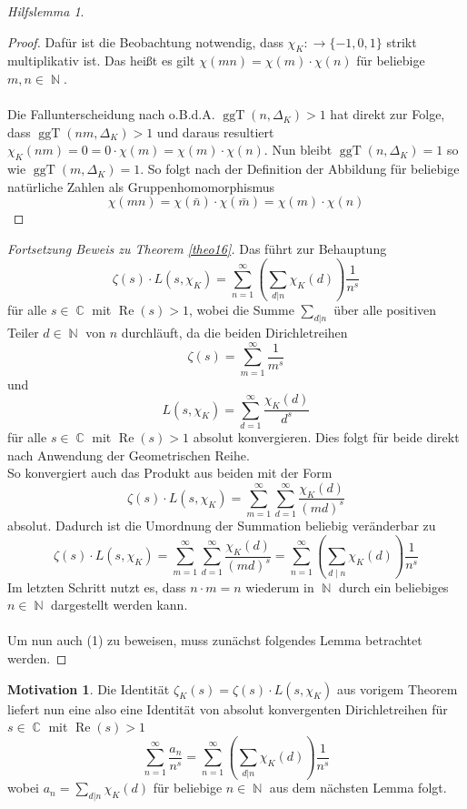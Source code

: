 \documentclass[10pt,a4paper]{article}
\theoremstyle{plain}
\theoremstyle{definition}
\newtheorem*{mot}{Motivation}
\theoremstyle{remark}
\newtheorem{hilfslem}{Hilfslemma}
\DeclareMathOperator{\C}{\mathbb{C}}
\DeclareMathOperator{\N}{\mathbb{N}}
\DeclareMathOperator{\re}{Re}
\DeclareMathOperator{\ggT}{ggT}
\begin{document}
\begin{hilfslem}
\begin{proof}
Dafür ist die Beobachtung notwendig, dass $\chi_K \colon \rightarrow \{-1,0,1\}$ strikt multiplikativ ist. Das heißt es gilt $\chi(mn)=\chi(m)\cdot\chi(n)$ für beliebige $m,n \in \N$. \\
\\
Die Fallunterscheidung nach o.B.d.A. $\ggT(n,\Delta_K)>1$ hat direkt zur Folge, dass $\ggT(nm,\Delta_K)>1$ und daraus resultiert $\chi_K(nm)=0=0\cdot \chi(m)= \chi(m)\cdot \chi(n)$.
Nun bleibt $\ggT(n,\Delta_K)=1$ so wie $\ggT(m,\Delta_K)=1$. So folgt nach der Definition der Abbildung für beliebige natürliche Zahlen als Gruppenhomomorphismus $$\chi(mn)=\chi(\bar{n})\cdot \chi(\bar{m})= \chi(m)\cdot \chi(n)$$

 \end{proof}
 \end{hilfslem}

\begin{proof}[Fortsetzung Beweis zu Theorem \ref{theo16}]\renewcommand{\qedsymbol}{}
 Das führt zur Behauptung $$\zeta(s)\cdot L(s,\chi_K) = \sum_{n=1}^{\infty}(\sum_{d|n}\chi_K(d))\frac{1}{n^s}$$ für alle $s \in \C $ mit $ \re(s) >1$, wobei die Summe $\sum_{d|n}$ über alle positiven Teiler $d \in \N$ von $n$ durchläuft, da die beiden Dirichletreihen $$\zeta(s) = \sum_{m=1}^{\infty}\frac{1}{m^s} $$ und $$L(s,\chi_K)= \sum_{d=1}^{\infty}\frac{\chi_K(d)}{d^s}$$ für alle $s \in \C $ mit $ \re(s) >1$ absolut konvergieren. Dies folgt für beide direkt nach Anwendung der Geometrischen Reihe.
 \\
 So konvergiert auch das Produkt aus beiden mit der Form $$\zeta(s) \cdot L(s,\chi_K) = \sum_{m=1}^{\infty} \sum_{d=1}^{\infty}\frac{\chi_K(d)}{(md)^s}$$ absolut.
Dadurch ist die Umordnung der Summation beliebig veränderbar zu $$\zeta(s) \cdot L(s,\chi_K)=\sum_{m=1}^{\infty} \sum_{d=1}^{\infty}\frac{\chi_K(d)}{(md)^s}= \sum_{n=1}^{\infty}(\sum_{d \mid n}\chi_K(d))\frac{1}{n^s}$$
Im letzten Schritt nutzt es, dass $n \cdot m = n$ wiederum in $\N$ durch ein beliebiges $n \in \N$ dargestellt werden kann.\\
\\Um nun auch (1) zu beweisen, muss zunächst folgendes Lemma betrachtet werden.
 
 \end{proof}


 
\begin{mot}
Die Identität  $\zeta_K(s) = \zeta(s)\cdot L(s,\chi_K) $ aus vorigem Theorem liefert nun eine also eine Identität von absolut konvergenten Dirichletreihen für $s \in \C $ mit $ \re(s) > 1$ $$ \sum_{n=1}^{\infty}\frac{a_n}{n^s}= \sum_{n=1}^{\infty}(\sum_{d|n}\chi_K(d))\frac{1}{n^s}$$
wobei $a_n = \sum_{d|n}\chi_K(d)$ für beliebige $n \in \N$ aus dem nächsten Lemma folgt.
 \end{mot}
 
\end{document}
